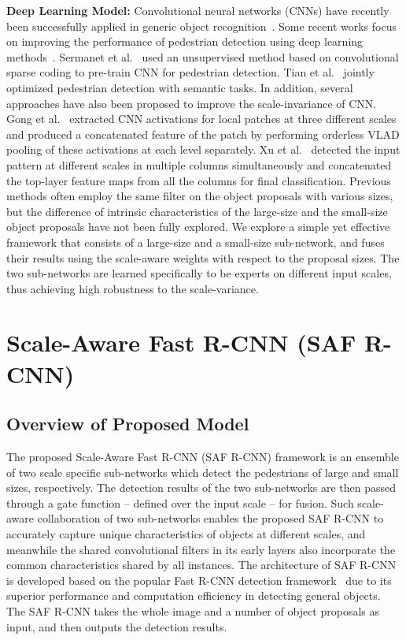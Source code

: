 \documentclass[journal]{IEEEtran}
\begin{document}
\textbf{Deep Learning Model:} Convolutional neural networks (CNNs) have recently been successfully applied in generic object recognition~\cite{girshick2014rich,he2014spatial,girshick2015fast,ren2015faster,sermanet2013overfeat}. 
Some recent works  focus on improving the performance of pedestrian detection using deep learning methods~\cite{ouyang2013joint,sermanet2013pedestrian,ouyang2012discriminative,ta_cnn}. Sermanet et al.~\cite{sermanet2013pedestrian} used an unsupervised method based on convolutional sparse coding to pre-train CNN for pedestrian detection. Tian et al.~\cite{ta_cnn} jointly optimized pedestrian detection with semantic tasks. In addition, several approaches have also been proposed to improve the scale-invariance of CNN. Gong et al.~\cite{gong2014multi} extracted CNN activations for local patches at three different scales and produced a concatenated feature of the patch by performing orderless VLAD pooling of these activations at each level separately. Xu et al.~\cite{xu2014scale} detected the input pattern at different scales in multiple columns simultaneously and concatenated the top-layer feature maps from all the columns for final classification.  
Previous methods often employ the same filter on the object proposals with various sizes, but the difference of intrinsic characteristics of the large-size and the small-size object proposals have not been fully explored. We explore a simple yet effective framework that consists of a large-size and a small-size sub-network, and fuses their results using the scale-aware weights with respect to the proposal sizes. The two sub-networks are learned specifically to be experts on different input scales, thus achieving high robustness to the scale-variance. 


\section{Scale-Aware Fast R-CNN (SAF R-CNN)}

\subsection{Overview of Proposed Model}
The proposed Scale-Aware Fast R-CNN (SAF R-CNN) framework is an ensemble of two scale specific  sub-networks which detect the pedestrians of large  and small sizes, respectively. The detection results of the two sub-networks are then passed  through a  gate function -- defined over the input scale -- for fusion. Such scale-aware collaboration of two sub-networks enables the proposed SAF R-CNN to accurately capture unique characteristics of objects at different scales, and meanwhile the shared convolutional filters in its early layers also incorporate the common characteristics shared by all instances. The architecture of SAF R-CNN is developed based on the popular Fast R-CNN detection framework~\cite{girshick2015fast} due to its superior performance and computation efficiency in detecting general objects. The SAF R-CNN takes the whole image and a number of object proposals as input, and then outputs the detection results. 
\end{document}
